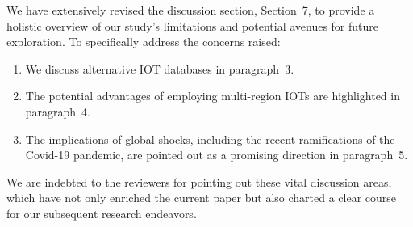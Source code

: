 \documentclass[12pt]{article}
\begin{document}
We have extensively revised the discussion section, Section~7, to provide a
holistic overview of our study's limitations and potential avenues for future
exploration. To specifically address the concerns raised:
\begin{enumerate}
\item
  We discuss alternative IOT databases in paragraph~3.
\item
  The potential advantages of employing multi-region IOTs are highlighted in
  paragraph~4.
\item
  The implications of global shocks, including the recent ramifications of the
  Covid-19 pandemic, are pointed out as a promising direction in paragraph~5.
\end{enumerate}
We are indebted to the reviewers for pointing out these vital discussion areas,
which have not only enriched the current paper but also charted a clear course
for our subsequent research endeavors.




\end{document}
